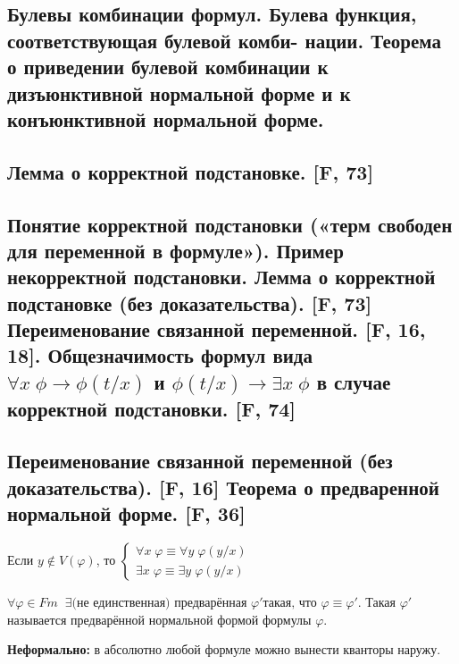 \documentclass[a4paper, fleqn]{article}
\begin{document}
    \subsection{ Булевы комбинации формул. Булева функция, соответствующая булевой комби- нации. Теорема о приведении булевой комбинации к дизъюнктивной нормальной форме и к конъюнктивной нормальной форме.}

    \subsection{Лемма о корректной подстановке. [F, 73]}

    \subsection{Понятие корректной подстановки («терм свободен для переменной в формуле»). Пример некорректной подстановки. Лемма о корректной подстановке (без доказательства). [F, 73] Переименование связанной переменной. [F, 16, 18]. Общезначимость формул вида $\forall x \; \phi \to \phi(t/x)$ и $\phi(t/x) \to \exists x \; \phi$ в случае корректной подстановки. [F, 74]}

    \subsection{Переименование связанной переменной (без доказательства). [F, 16] Теорема о предваренной нормальной форме. [F, 36]}
    \begin{proposition}

        Если $y \notin V(\varphi)$, то $\begin{cases}
        \forall x \; \varphi \equiv \forall y \; \varphi(y/x) \\
        \exists x \; \varphi \equiv \exists y \; \varphi(y/x)
        \end{cases}$
    \end{proposition}

    \begin{theorem}
        $\forall \varphi \in Fm \;\; \exists \text{(не единственная) предварённая } \varphi' \text{такая, что } \varphi \equiv \varphi'$. Такая $\varphi'$ называется предварённой нормальной формой формулы $\varphi$.
    \end{theorem}

    \textbf{Неформально:} в абсолютно любой формуле можно вынести кванторы наружу.
\end{document}
